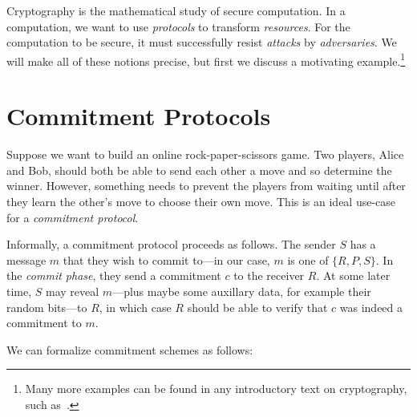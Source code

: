 
Cryptography is the mathematical study of secure computation. In a computation,
we want to use \emph{protocols} to transform \emph{resources}. For the
computation to be secure, it must successfully resist \emph{attacks} by
\emph{adversaries}. We will make all of these notions precise, but first we
discuss a motivating example.\footnote{Many more examples can be found in any
	introductory text on cryptography, such as~\cite{katz-lindell-2014, rosulek-2021,
		pass-shelat-2020}.}

\section{Commitment Protocols}

Suppose we want to build an online rock-paper-scissors game. Two players, Alice
and Bob, should both be able to send each other a move and so determine the
winner. However, something needs to prevent the players from waiting until after
they learn the other's move to choose their own move. This is an ideal use-case
for a \emph{commitment protocol}.

Informally, a commitment protocol proceeds as follows. The sender $S$ has a
message $m$ that they wish to commit to---in our case, $m$ is one of
$\{R,P,S\}$. In the \emph{commit phase}, they send a commitment $c$ to the
receiver $R$. At some later time, $S$ may reveal $m$---plus maybe some auxillary
data, for example their random bits---to $R$, in which case $R$ should be able
to verify that $c$ was indeed a commitment to $m$.

We can formalize commitment schemes as follows:

